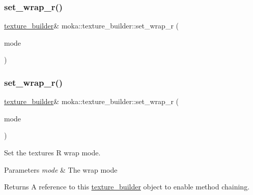 \subsubsection{\texorpdfstring{set\_wrap\_r()}{set\_wrap\_r()}\hspace{0.1cm}{\footnotesize\ttfamily [1/2]}}
{\footnotesize\ttfamily \mbox{\hyperlink{classmoka_1_1texture__builder}{texture\+\_\+builder}}\& moka\+::texture\+\_\+builder\+::set\+\_\+wrap\+\_\+r (\begin{DoxyParamCaption}\item[{\mbox{\hyperlink{namespacemoka_afda3faa87bacaacc6008d8c1f73f6462}{wrap\+\_\+mode}}}]{mode }\end{DoxyParamCaption})}

\mbox{\label{classmoka_1_1texture__builder_ab1113f82648d8e5555f53e0fd65ba294}} 
\subsubsection{\texorpdfstring{set\_wrap\_r()}{set\_wrap\_r()}\hspace{0.1cm}{\footnotesize\ttfamily [2/2]}}
{\footnotesize\ttfamily \mbox{\hyperlink{classmoka_1_1texture__builder}{texture\+\_\+builder}}\& moka\+::texture\+\_\+builder\+::set\+\_\+wrap\+\_\+r (\begin{DoxyParamCaption}\item[{\mbox{\hyperlink{namespacemoka_afda3faa87bacaacc6008d8c1f73f6462}{wrap\+\_\+mode}}}]{mode }\end{DoxyParamCaption})}



Set the texture\textquotesingle{}s R wrap mode. 


\begin{DoxyParams}{Parameters}
{\em mode} & The wrap mode \\
\hline
\end{DoxyParams}
\begin{DoxyReturn}{Returns}
A reference to this \mbox{\hyperlink{classmoka_1_1texture__builder}{texture\+\_\+builder}} object to enable method chaining. 
\end{DoxyReturn}
\mbox{\label{classmoka_1_1texture__builder_a555d3ea33ae09a175916eee13df9170c}} 
